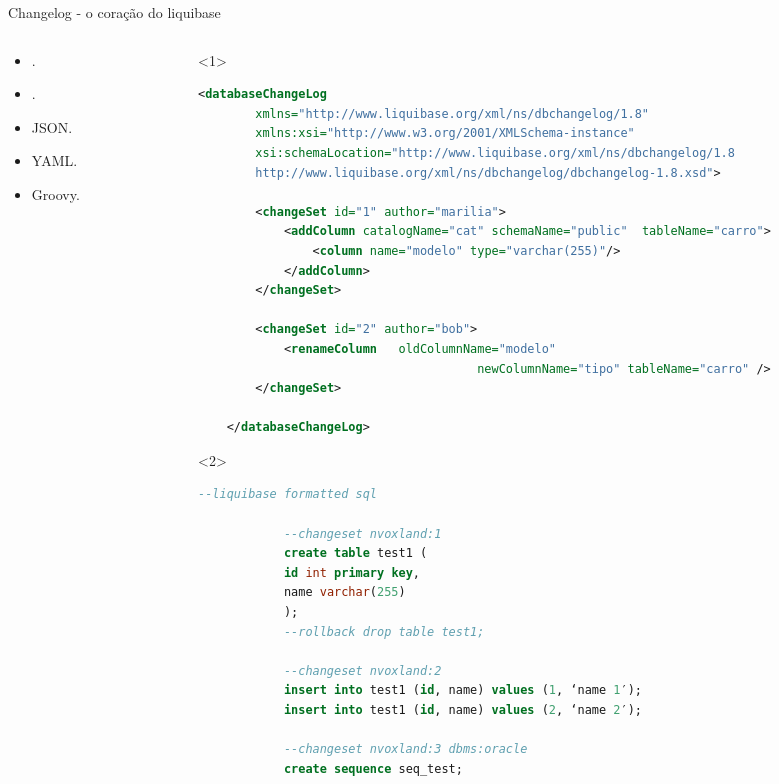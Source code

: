 \begin{frame}[fragile]{Changelog - o coração do liquibase}
    
\begin{columns}[t]
  \begin{column}[T]{2cm}
    \begin{itemize}
        \normalsize
        \item {}.
        \item {}.
        \item JSON.
        \item YAML.
        \item Groovy.
    \end{itemize}
 \end{column}
  \begin{column}[T]{9cm}
    \begin{onlyenv}<1>
    \begin{lstlisting}[language=XML]
    <databaseChangeLog
        xmlns="http://www.liquibase.org/xml/ns/dbchangelog/1.8"
        xmlns:xsi="http://www.w3.org/2001/XMLSchema-instance"
        xsi:schemaLocation="http://www.liquibase.org/xml/ns/dbchangelog/1.8
        http://www.liquibase.org/xml/ns/dbchangelog/dbchangelog-1.8.xsd">
        
        <changeSet id="1" author="marilia">
            <addColumn catalogName="cat" schemaName="public"  tableName="carro">
                <column name="modelo" type="varchar(255)"/>
            </addColumn>
        </changeSet>
        
        <changeSet id="2" author="bob">
            <renameColumn   oldColumnName="modelo" 
                                       newColumnName="tipo" tableName="carro" />
        </changeSet>
    
    </databaseChangeLog>
    \end{lstlisting}
\end{onlyenv}
    \begin{onlyenv}<2>
        \begin{lstlisting}[language=SQL]
            --liquibase formatted sql
            
            --changeset nvoxland:1
            create table test1 (
            id int primary key,
            name varchar(255)
            );
            --rollback drop table test1;
            
            --changeset nvoxland:2
            insert into test1 (id, name) values (1, ‘name 1′);
            insert into test1 (id, name) values (2, ‘name 2′);
            
            --changeset nvoxland:3 dbms:oracle
            create sequence seq_test;
        \end{lstlisting}
\end{onlyenv}
\end{column}
\end{columns}

\end{frame}


